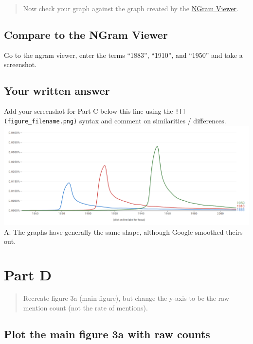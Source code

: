 \documentclass[
]{article}
\begin{document}
\begin{quote}
Now check your graph against the graph created by the
\href{https://books.google.com/ngrams/}{NGram Viewer}.
\end{quote}

\hypertarget{compare-to-the-ngram-viewer}{%
\subsection{Compare to the NGram
Viewer}\label{compare-to-the-ngram-viewer}}

Go to the ngram viewer, enter the terms ``1883'', ``1910'', and ``1950''
and take a screenshot.

\hypertarget{your-written-answer-2}{%
\subsection{Your written answer}\label{your-written-answer-2}}

Add your screenshot for Part C below this line using the
\texttt{!{[}{]}(figure\_filename.png)} syntax and comment on
similarities / differences. \includegraphics{google_ngram.png} A: The
graphs have generally the same shape, although Google smoothed theirs
out.

\hypertarget{part-d}{%
\section{Part D}\label{part-d}}

\begin{quote}
Recreate figure 3a (main figure), but change the y-axis to be the raw
mention count (not the rate of mentions).
\end{quote}

\hypertarget{plot-the-main-figure-3a-with-raw-counts}{%
\subsection{Plot the main figure 3a with raw
counts}\label{plot-the-main-figure-3a-with-raw-counts}}
\end{document}
